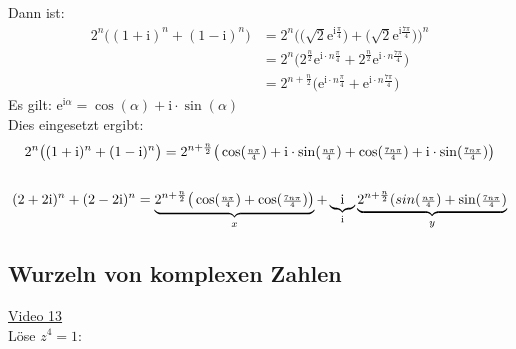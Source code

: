Dann ist:\\
\begin{align*}
2^n \big((1+\mathrm{i})^n+(1-\mathrm{i})^n  \big)&=2^n \bigg(\big(\sqrt{2}\mathrm{e}^{\mathrm{i}\frac{\pi}{4}}\big)+\big(\sqrt{2} \mathrm{e}^{\mathrm{i}\frac{7\pi}{4}} \big)  \bigg)^n\\
&=2^n\big(2^{\frac{n}{2}}\mathrm{e}^{\mathrm{i}\cdot n\frac{\pi}{4}}+2^{\frac{n}{2}}\mathrm{e}^{\mathrm{i}\cdot n\frac{7\pi}{4}}\big)\\
&=2^{n+\frac{n}{2}}\big(\mathrm{e}^{\mathrm{i}\cdot n\frac{\pi}{4}}+\mathrm{e}^{\mathrm{i}\cdot n\frac{7\pi}{4}}\big)
\end{align*}
Es gilt: $\mathrm{e}^{\mathrm{i}\alpha}=\cos(\alpha)+\mathrm{i}\cdot \sin(\alpha)$\\
Dies eingesetzt ergibt:\\ 
\begin{align*}
2^n \big((1+\mathrm{i})^n+(1-\mathrm{i})^n  \big)&=2^{n+\frac{n}{2}}\big(\cos(\genfrac{}{}{}{2}{ n\pi}{ 4}) +\mathrm{i}\cdot \sin(\genfrac{}{}{}{2}{n\pi}{4})+ \cos(\genfrac{}{}{}{2}{  7 n \pi }{ 4}) +\mathrm{i}\cdot \sin(\genfrac{}{}{}{2}{ 7 n\pi  }{4})  \big)\\
&
\end{align*}
\begin{align*}
(2+2\mathrm{i})^n+(2-2\mathrm{i})^n=\underbrace {2^{n+\frac{n}{2}}\big(\cos(\genfrac{}{}{}{2}{n\pi }{4})+\cos(\genfrac{}{}{}{2}{ 7 n\pi  }{4}) \big)}_{x}+\underbrace {\mathrm{i} }_{\mathrm{i}}
\underbrace {2^{n+\frac{n}{2}}(sin(\genfrac{}{}{}{2}{n\pi}{4})+\sin(\genfrac{}{}{}{2}{ 7 n\pi }{4 }   )}_{y}
\end{align*}
\subsection{Wurzeln von komplexen Zahlen}
\href{https://youtu.be/5IVSZmGtt2Q}{Video 13}\\
Löse $ z^4=1 $:\\


